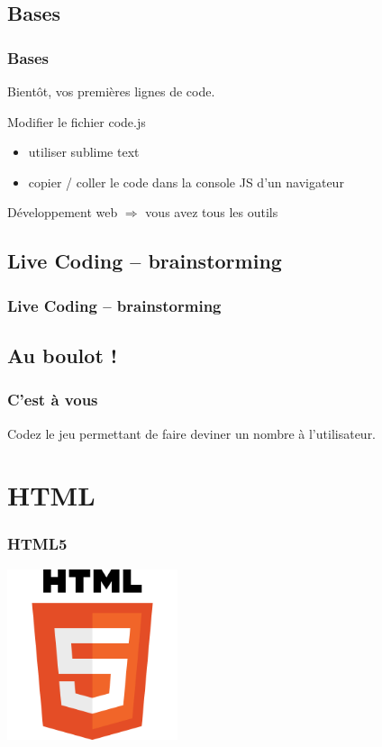 \documentclass{beamer}
\begin{document}
    \subsection{Bases}
    \begin{frame}
		\frametitle{Bases}

		\begin{center}
			Bientôt, vos premières lignes de code.
		\end{center}		 
	
		\vspace{1cm}

		Modifier le fichier code.js
        \begin{itemize}
          \item{utiliser sublime text}
          \item{copier / coller le code dans la console JS d'un navigateur}
        \end{itemize}

		\vspace{1cm}

		\centering Développement web $\Rightarrow$ vous avez tous les outils 
    \end{frame}

	\subsection{Live Coding -- brainstorming}
	\begin{frame}
		\frametitle{Live Coding -- brainstorming}
	\end{frame}

	\subsection{Au boulot !}
    \begin{frame}
		\frametitle{C'est à vous}
		\centering Codez le jeu permettant de faire deviner un nombre à l'utilisateur.
    \end{frame}

	\section{HTML}
	\begin{frame}
		\frametitle{HTML5}
		\centering \includegraphics[width=5cm]{images/HTML5_Logo_512.png} 
    \end{frame}
    
\end{document}
